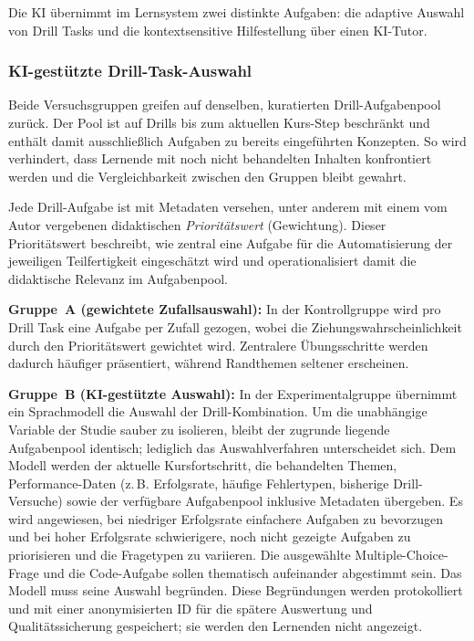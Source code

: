 Die KI übernimmt im Lernsystem zwei distinkte Aufgaben: die adaptive Auswahl von Drill Tasks und die kontextsensitive Hilfestellung über einen KI-Tutor.

\subsubsection{KI-gestützte Drill-Task-Auswahl}\label{subsec:ki-drill-auswahl}
Beide Versuchsgruppen greifen auf denselben, kuratierten Drill-Aufgabenpool zurück. Der Pool ist auf Drills bis zum aktuellen Kurs-Step beschränkt und enthält damit ausschließlich Aufgaben zu bereits eingeführten Konzepten. So wird verhindert, dass Lernende mit noch nicht behandelten Inhalten konfrontiert werden und die Vergleichbarkeit zwischen den Gruppen bleibt gewahrt.

Jede Drill-Aufgabe ist mit Metadaten versehen, unter anderem mit einem vom Autor vergebenen didaktischen \textit{Prioritätswert} (Gewichtung). Dieser Prioritätswert beschreibt, wie zentral eine Aufgabe für die Automatisierung der jeweiligen Teilfertigkeit eingeschätzt wird und operationalisiert damit die didaktische Relevanz im Aufgabenpool.

\textbf{Gruppe~A (gewichtete Zufallsauswahl):} In der Kontrollgruppe wird pro Drill Task eine Aufgabe per Zufall gezogen, wobei die Ziehungswahrscheinlichkeit durch den Prioritätswert gewichtet wird. Zentralere Übungsschritte werden dadurch häufiger präsentiert, während Randthemen seltener erscheinen.

\textbf{Gruppe~B (KI-gestützte Auswahl):} In der Experimentalgruppe übernimmt ein Sprachmodell die Auswahl der Drill-Kombination. Um die unabhängige Variable der Studie sauber zu isolieren, bleibt der zugrunde liegende Aufgabenpool identisch; lediglich das Auswahlverfahren unterscheidet sich.
Dem Modell werden der aktuelle Kursfortschritt, die behandelten Themen, Performance-Daten (z.\,B. Erfolgsrate, häufige Fehlertypen, bisherige Drill-Versuche) sowie der verfügbare Aufgabenpool inklusive Metadaten übergeben. Es wird angewiesen, bei niedriger Erfolgsrate einfachere Aufgaben zu bevorzugen und bei hoher Erfolgsrate schwierigere, noch nicht gezeigte Aufgaben zu priorisieren und die Fragetypen zu variieren. Die ausgewählte Multiple-Choice-Frage und die Code-Aufgabe sollen thematisch aufeinander abgestimmt sein.
Das Modell muss seine Auswahl begründen. Diese Begründungen werden protokolliert und mit einer anonymisierten ID für die spätere Auswertung und Qualitätssicherung gespeichert; sie werden den Lernenden nicht angezeigt.

